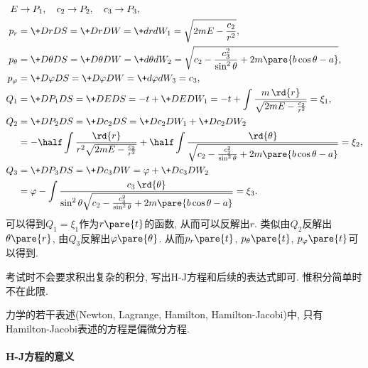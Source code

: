 \documentclass{ctexart}
\begin{document}
\begin{sample}
\begin{ex}[习题3.22]
\begin{align*}
            E &\rightarrow P_1,\quad c_2 \rightarrow P_2,\quad c_3\rightarrow P_3, \\
            p_r &= \+DrDS = \+DrDW = \+drd{W_1} = \sqrt{2mE - \frac{c_2}{r^2}}, \\
            p_\theta &= \+D\theta DS = \+D\theta DW = \+d\theta d{W_2} = \sqrt{c_2 - \frac{c_3^2}{\sin^2\theta} + 2m\pare{b\cos\theta - a}}, \\
            p_\varphi &= \+D\varphi DS = \+D\varphi DW = \+d\varphi d{W_3} = c_3, \\
            Q_1 &= \+D{P_1}DS = \+DEDS = -t + \+DED{W_1} = -t + \int \frac{m\,\rd{r}}{\sqrt{2mE - \frac{c_2}{r^2}}} = \xi_1, \\
            Q_2 &= \+D{P_2}DS = \+D{c_2}DS = \+D{c_2}D{W_1} + \+D{c_2}D{W_2} \\
            &= -\half \int \frac{\rd{r}}{r^2\sqrt{2mE - \frac{c_2}{r^2}}} + \half \int \frac{\rd{\theta}}{\sqrt{c_2 - \frac{c_3^2}{\sin^2\theta} + 2m\pare{b\cos\theta - a}}} = \xi_2, \\
            Q_3 &= \+D{P_3}DS = \+D{c_3}DW = \varphi + \+D{c_3}D{W_2} \\
            &= \varphi - \int \frac{c_3\,\rd{\theta}}{\sin^2\theta\sqrt{c_2 - \frac{c_3^2}{\sin^2\theta} + 2m\pare{b\cos\theta - a}}} = \xi_3.
        \end{align*}
        可以得到$Q_1=\xi_1$作为$r\pare{t}$的函数, 从而可以反解出$r$. 类似由$Q_2$反解出$\theta\pare{r}$, 由$Q_3$反解出$\varphi\pare{\theta}$. 从而$p_r\pare{t}$, $p_\theta\pare{t}$, $p_\varphi\pare{t}$可以得到.
    \end{ex}
\end{sample}
\begin{remark}
    考试时不会要求积出复杂的积分, 写出H-J方程和后续的表达式即可. 惟积分简单时不在此限.
\end{remark}
\begin{remark}
    力学的若干表述(Newton, Lagrange, Hamilton, Hamilton-Jacobi)中, 只有Hamilton-Jacobi表述的方程是偏微分方程.
\end{remark}

\paragraph{H-J方程的意义} %
\label{par:h_j方程的意义}
\end{document}
